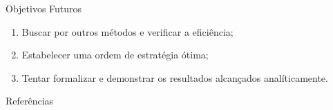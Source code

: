 \documentclass[aspectratio=169]{beamer}
\begin{document}
\begin{frame}{Objetivos Futuros}
	\begin{enumerate}
		\item Buscar por outros métodos e verificar a eficiência;
		\item Estabelecer uma ordem de estratégia ótima;
		\item Tentar formalizar e demonstrar os resultados alcançados analíticamente.
	\end{enumerate}
\end{frame}



\begin{frame}{Referências}
	\nocite{*}
	\printbibliography
\end{frame}
\end{document}
